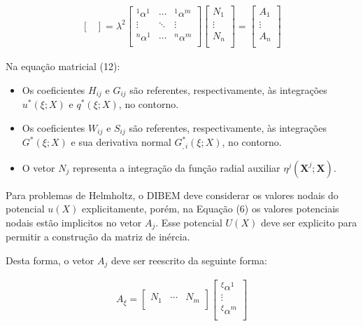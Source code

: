 \documentclass[a4paper,12p]{article}
\begin{document}
\begin{equation}
\begin{gathered}
\begin{bmatrix}
	\end{bmatrix}
	=
	\lambda^{2}
	\begin{bmatrix}
	{}^{1}\alpha^{1} & \cdots & {}^{1}\alpha^{m} \\
	\vdots  & \ddots & \vdots \\
	{}^{n}\alpha^{1} & \cdots & {}^{n}\alpha^{m} \\
	\end{bmatrix}
	\begin{bmatrix}
	N_{1}\\
	\vdots\\
	N_{n}\\
	\end{bmatrix}
	=
	\begin{bmatrix}
	A_{1}\\
	\vdots\\
	A_{n}\\
	\end{bmatrix}
	\end{gathered}
	\end{equation}
	
	Na equação matricial (12):
	\begin{itemize}
		\item Os coeficientes $H_{ij}$ e $G_{ij}$ são referentes, respectivamente, às integrações $u^{*}(\xi;X)$ e $q^{*}(\xi;X)$, no contorno.
		\item Os coeficientes $W_{ij}$ e $S_{ij}$ são referentes, respectivamente, às integrações $G^{*}(\xi;X)$ e sua derivativa normal $G^{*}_{,i}(\xi;X)$, no contorno.
		\item O vetor $N_{j}$ representa a integração da função radial auxiliar $\eta^{j}(\textbf{X}^{j};\textbf{X})$.
	\end{itemize}
	
	Para problemas de Helmholtz, o DIBEM deve considerar os valores nodais do potencial $u(X)$ explicitamente, porém, na Equação (6) os valores potenciais nodais estão implicitos no vetor $A_{j}$. Esse potencial $U(X)$ deve ser explicito para permitir a construção da matriz de inércia.
	
	Desta forma, o vetor $A_{j}$ deve ser reescrito da seguinte forma:
	
	\begin{equation}
	\begin{gathered}
	A_{\xi} = 
	\begin{bmatrix}
	N_{1}  & \cdots  & N_{m} \\
	\end{bmatrix}
	\begin{bmatrix}
	{}^{\xi}\alpha^{1}\\
	\vdots \\
	{}^{\xi}\alpha^{m}\\
	\end{bmatrix}
	\end{gathered}
	\end{equation}
	
\end{document}
